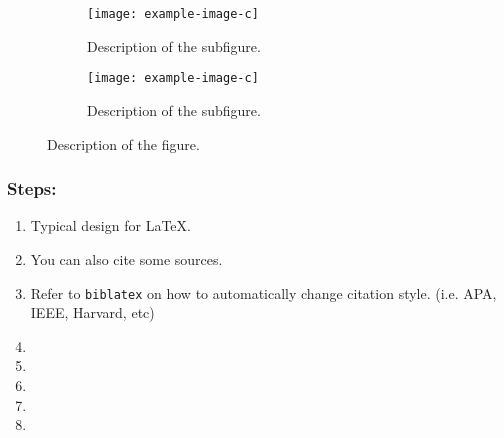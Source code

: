 \begin{figure}[ht]
    \centering
    \begin{subfigure}{.45\textwidth}
        \centering
        \texttt{[image: example-image-c]}
        \caption{Description of the subfigure.}
        \label{fig:4.3a}
    \end{subfigure}
    \hspace{10pt}
    \begin{subfigure}{.45\textwidth}
        \centering
        \texttt{[image: example-image-c]}
        \caption{Description of the subfigure.}
        \label{fig:4.3b}
    \end{subfigure}
    \caption{Description of the figure.}
    \label{fig:4.3}
\end{figure}
\begin{minipage}{\textwidth}
\begin{leftbox}
    \subsubsection*{Steps:}
    \begin{enumerate}
        \item Typical design for \LaTeX.
        \item You can also cite some sources. \cite{conference2025}
        \item Refer to \verb|biblatex| on how to automatically change citation style. (i.e. APA, IEEE, Harvard, etc)
        \item \lipsum[1][1]
        \item \lipsum[2][1]
        \item \lipsum[3][1]
        \item \lipsum[4][1]
        \item \lipsum[5][1]
    \end{enumerate} 
\end{leftbox}
\end{minipage}
\newpage